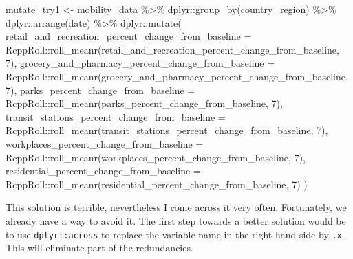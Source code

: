 \documentclass[
]{book}
\newenvironment{Shaded}{\begin{snugshade}}{\end{snugshade}}
\newcommand{\AttributeTok}[1]{\textcolor[rgb]{0.77,0.63,0.00}{#1}}
\newcommand{\DecValTok}[1]{\textcolor[rgb]{0.00,0.00,0.81}{#1}}
\newcommand{\FunctionTok}[1]{\textcolor[rgb]{0.00,0.00,0.00}{#1}}
\newcommand{\NormalTok}[1]{#1}
\newcommand{\OtherTok}[1]{\textcolor[rgb]{0.56,0.35,0.01}{#1}}
\newcommand{\SpecialCharTok}[1]{\textcolor[rgb]{0.00,0.00,0.00}{#1}}
\begin{document}
\begin{Shaded}
\begin{Highlighting}[]
\NormalTok{mutate\_try1 }\OtherTok{\textless{}{-}}\NormalTok{ mobility\_data }\SpecialCharTok{\%\textgreater{}\%} 
\NormalTok{  dplyr}\SpecialCharTok{::}\FunctionTok{group\_by}\NormalTok{(country\_region) }\SpecialCharTok{\%\textgreater{}\%} 
\NormalTok{  dplyr}\SpecialCharTok{::}\FunctionTok{arrange}\NormalTok{(date) }\SpecialCharTok{\%\textgreater{}\%} 
\NormalTok{  dplyr}\SpecialCharTok{::}\FunctionTok{mutate}\NormalTok{(}
    \AttributeTok{retail\_and\_recreation\_percent\_change\_from\_baseline =}\NormalTok{ RcppRoll}\SpecialCharTok{::}\FunctionTok{roll\_meanr}\NormalTok{(retail\_and\_recreation\_percent\_change\_from\_baseline, }\DecValTok{7}\NormalTok{),}
    \AttributeTok{grocery\_and\_pharmacy\_percent\_change\_from\_baseline =}\NormalTok{ RcppRoll}\SpecialCharTok{::}\FunctionTok{roll\_meanr}\NormalTok{(grocery\_and\_pharmacy\_percent\_change\_from\_baseline, }\DecValTok{7}\NormalTok{),}
    \AttributeTok{parks\_percent\_change\_from\_baseline =}\NormalTok{ RcppRoll}\SpecialCharTok{::}\FunctionTok{roll\_meanr}\NormalTok{(parks\_percent\_change\_from\_baseline, }\DecValTok{7}\NormalTok{),}
    \AttributeTok{transit\_stations\_percent\_change\_from\_baseline =}\NormalTok{ RcppRoll}\SpecialCharTok{::}\FunctionTok{roll\_meanr}\NormalTok{(transit\_stations\_percent\_change\_from\_baseline, }\DecValTok{7}\NormalTok{),}
    \AttributeTok{workplaces\_percent\_change\_from\_baseline =}\NormalTok{ RcppRoll}\SpecialCharTok{::}\FunctionTok{roll\_meanr}\NormalTok{(workplaces\_percent\_change\_from\_baseline, }\DecValTok{7}\NormalTok{),}
    \AttributeTok{residential\_percent\_change\_from\_baseline =}\NormalTok{ RcppRoll}\SpecialCharTok{::}\FunctionTok{roll\_meanr}\NormalTok{(residential\_percent\_change\_from\_baseline, }\DecValTok{7}\NormalTok{)}
\NormalTok{  )}
\end{Highlighting}
\end{Shaded}

This solution is terrible, nevertheless I come across it very often. Fortunately, we already have a way to avoid it. The first step towards a better solution would be to use \texttt{dplyr::across} to replace the variable name in the right-hand side by \texttt{.x}. This will eliminate part of the redundancies.
\end{document}
